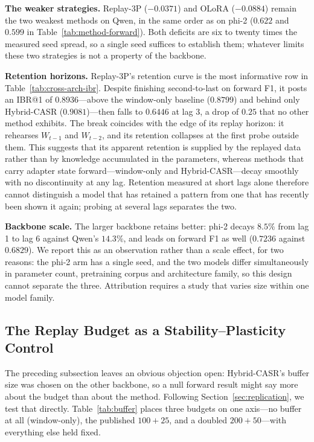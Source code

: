\textbf{The weaker strategies.} Replay-3P ($-0.0371$) and OLoRA ($-0.0884$) remain the two weakest methods on Qwen, in the same order as on phi-2 ($0.622$ and $0.599$ in Table~\ref{tab:method-forward}). Both deficits are six to twenty times the measured seed spread, so a single seed suffices to establish them; whatever limits these two strategies is not a property of the backbone.

\textbf{Retention horizons.} Replay-3P's retention curve is the most informative row in Table~\ref{tab:cross-arch-ibr}. Despite finishing second-to-last on forward F1, it posts an IBR@1 of $0.8936$---above the window-only baseline ($0.8799$) and behind only Hybrid-CASR ($0.9081$)---then falls to $0.6446$ at lag 3, a drop of $0.25$ that no other method exhibits. The break coincides with the edge of its replay horizon: it rehearses $W_{t-1}$ and $W_{t-2}$, and its retention collapses at the first probe outside them. This suggests that its apparent retention is supplied by the replayed data rather than by knowledge accumulated in the parameters, whereas methods that carry adapter state forward---window-only and Hybrid-CASR---decay smoothly with no discontinuity at any lag. Retention measured at short lags alone therefore cannot distinguish a model that has retained a pattern from one that has recently been shown it again; probing at several lags separates the two.

\textbf{Backbone scale.} The larger backbone retains better: phi-2 decays $8.5\%$ from lag 1 to lag 6 against Qwen's $14.3\%$, and leads on forward F1 as well ($0.7236$ against $0.6829$). We report this as an observation rather than a scale effect, for two reasons: the phi-2 arm has a single seed, and the two models differ simultaneously in parameter count, pretraining corpus and architecture family, so this design cannot separate the three. Attribution requires a study that varies size within one model family.

\subsection{The Replay Budget as a Stability--Plasticity Control}
\label{sec:buffer}

\noindent
The preceding subsection leaves an obvious objection open: Hybrid-CASR's buffer size was chosen on the other backbone, so a null forward result might say more about the budget than about the method. Following Section~\ref{sec:replication}, we test that directly. Table~\ref{tab:buffer} places three budgets on one axis---no buffer at all (window-only), the published $100{+}25$, and a doubled $200{+}50$---with everything else held fixed.

